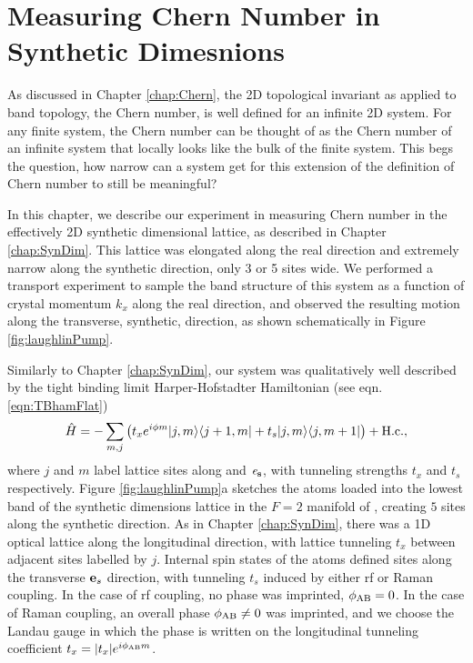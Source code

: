 \renewcommand{\thechapter}{7}

\chapter{Measuring Chern Number in Synthetic Dimesnions}\label{chap:BlochOsc}
As discussed in Chapter \ref{chap:Chern}, the 2D topological invariant as applied to band topology, the Chern number, is well defined for an infinite 2D system. For any finite system, the Chern number can be thought of as the Chern number of an infinite system that locally looks like the bulk of the finite system. This begs the question, how narrow can a system get for this extension of the definition of Chern number to still be meaningful? 

In this chapter, we describe our experiment in measuring Chern number in the effectively 2D synthetic dimensional lattice, as described in Chapter \ref{chap:SynDim}. This lattice was elongated along the real direction and extremely narrow along the synthetic direction, only 3 or 5 sites wide. We performed a transport experiment to sample the band structure of this system as a function of crystal momentum $k_x$ along the real direction, and observed the resulting motion along the transverse, synthetic, direction, as shown schematically in Figure \ref{fig:laughlinPump}. 

Similarly to Chapter \ref{chap:SynDim}, our system was qualitatively well described by the tight binding limit Harper-Hofstadter Hamiltonian (see eqn. \ref{eqn:TBhamFlat})\cite{Harper1955,Hofstadter1976}
\begin{equation}
\hat{H}= -\sum\limits_{m,j}\left({t_x e^{i\phi m}|j,m\rangle\langle j+1,m|+t_s|j,m\rangle\langle j,m+1|}\right) + \rm{H.c.},
\label{eqn:Hamiltonian}
\end{equation}
where $j$ and $m$ label lattice sites along \ex{} and $\bf{\mathit{e}_s}$, with tunneling strengths $t_x$ and $t_s$ respectively.
Figure \ref{fig:laughlinPump}a sketches the atoms loaded into the lowest band of the synthetic dimensions lattice in the $F=2$ manifold of \Rb{}, creating $5$ sites along the synthetic direction. As in Chapter \ref{chap:SynDim}, there was a 1D optical lattice along the longitudinal \ex{} direction, with lattice tunneling $t_x$ between adjacent sites labelled by $j$. Internal spin states of the atoms defined sites along the transverse $\textbf{e}_s{}$ direction, with tunneling $t_s$ induced by either rf or Raman coupling. In the case of rf coupling, no phase was imprinted, $\phi_{\rm AB}=0$. In the case of Raman coupling, an overall phase $\phi_{\rm AB}\neq 0$ was imprinted, and we choose the Landau gauge in which the phase is written on the longitudinal tunneling coefficient $t_x=|t_x|e^{i\phi_{\rm AB}m}$.

